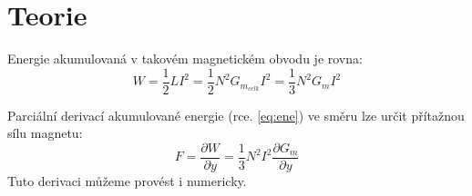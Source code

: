 \documentclass[11pt,oneside]{article} %
\begin{document}
\section{Teorie}

Energie akumulovaná v takovém magnetickém obvodu je rovna:
\begin{equation} \label{eq:ene}
   W = \frac{1}{2} L I^2 = \frac{1}{2} N^2 G_{m_{celk}} I^2 = \frac{1}{3}N^2 G_m I^2
\end{equation}

Parciální derivací akumulované energie (rce. \ref{eq:ene}) ve směru lze určit přítažnou sílu magnetu:
\begin{equation}
   F = \frac{\partial W}{\partial y} = \frac{1}{3}N^2 I^2 \frac{\partial G_m}{\partial y}
\end{equation}
Tuto derivaci můžeme provést i numericky.
\end{document}
